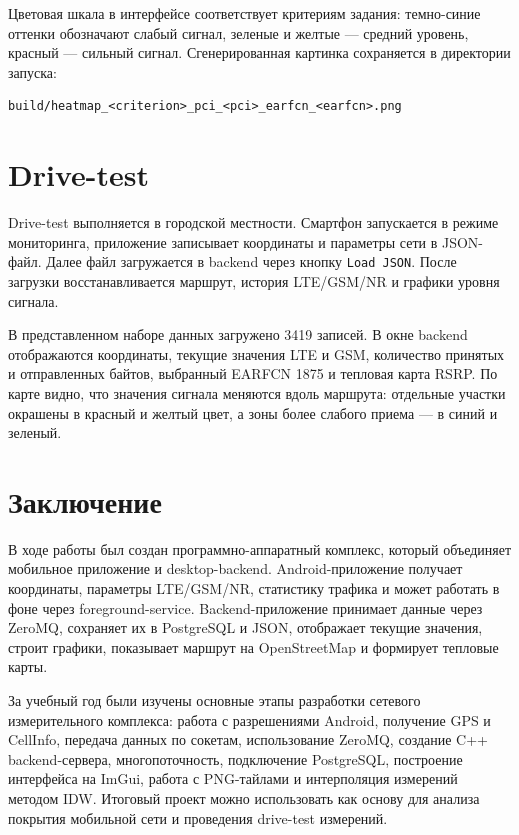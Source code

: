 \documentclass[14pt,a4paper]{extarticle}
\begin{document}
Цветовая шкала в интерфейсе соответствует критериям задания: темно-синие оттенки обозначают слабый сигнал, зеленые и желтые --- средний уровень, красный --- сильный сигнал. Сгенерированная картинка сохраняется в директории запуска:

\begin{lstlisting}[caption={Имя файла тепловой карты}]
build/heatmap_<criterion>_pci_<pci>_earfcn_<earfcn>.png
\end{lstlisting}

\section{Drive-test}

Drive-test выполняется в городской местности. Смартфон запускается в режиме мониторинга, приложение записывает координаты и параметры сети в JSON-файл. Далее файл загружается в backend через кнопку \texttt{Load JSON}. После загрузки восстанавливается маршрут, история LTE/GSM/NR и графики уровня сигнала.

В представленном наборе данных загружено 3419 записей. В окне backend отображаются координаты, текущие значения LTE и GSM, количество принятых и отправленных байтов, выбранный EARFCN 1875 и тепловая карта RSRP. По карте видно, что значения сигнала меняются вдоль маршрута: отдельные участки окрашены в красный и желтый цвет, а зоны более слабого приема --- в синий и зеленый.

\section{Заключение}

В ходе работы был создан программно-аппаратный комплекс, который объединяет мобильное приложение и desktop-backend. Android-приложение получает координаты, параметры LTE/GSM/NR, статистику трафика и может работать в фоне через foreground-service. Backend-приложение принимает данные через ZeroMQ, сохраняет их в PostgreSQL и JSON, отображает текущие значения, строит графики, показывает маршрут на OpenStreetMap и формирует тепловые карты.

За учебный год были изучены основные этапы разработки сетевого измерительного комплекса: работа с разрешениями Android, получение GPS и CellInfo, передача данных по сокетам, использование ZeroMQ, создание C++ backend-сервера, многопоточность, подключение PostgreSQL, построение интерфейса на ImGui, работа с PNG-тайлами и интерполяция измерений методом IDW. Итоговый проект можно использовать как основу для анализа покрытия мобильной сети и проведения drive-test измерений.
\end{document}
